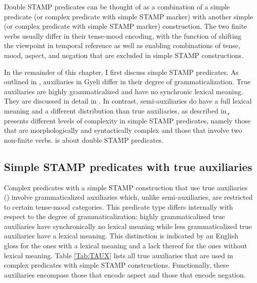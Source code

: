Double STAMP predicates can be thought of as a combination of a simple predicate (or complex predicate with simple STAMP marker)  with another simple (or complex predicate with simple STAMP marker) construction. The two finite verbs usually differ in their tense-mood encoding, with the function of shifting the viewpoint in temporal reference as well as enabling combinations of tense, mood, aspect, and negation that are excluded in simple STAMP constructions.

In the remainder of this chapter, I first discuss simple STAMP predicates. As outlined in , auxiliaries in Gyeli differ in their degree of grammaticalization. True auxiliaries are highly grammaticalized and have no synchronic lexical meaning. They are discussed in detail in . In contrast, semi-auxiliaries do have a full lexical meaning and a different distribution than true auxiliaries, as described in \c
{}.  presents different levels of complexity in simple STAMP predicates, namely those that are morphologically and syntactically complex and those that involve two non-finite verbs.  is about double STAMP predicates.


















\subsection{Simple STAMP predicates with true auxiliaries}
\label {sec:ComplAUX}

Complex predicates with a simple STAMP construction that use true auxiliaries () involve grammaticalized auxiliaries which, unlike semi-auxiliaries, are restricted to certain tense-mood categories.  This predicate type differs internally with respect to the degree of grammaticalization: highly grammaticalized true auxiliaries have synchronically no lexical meaning while less grammaticalized true auxiliaries have a lexical meaning. This distinction is indicated by an English gloss for the ones with a lexical meaning and a lack thereof for the ones without lexical meaning. Table \ref{Tab:TAUX} lists all true auxiliaries that are used in complex predicates with simple STAMP constructions. Functionally, these auxiliaries encompass those that encode aspect and those that encode negation.

